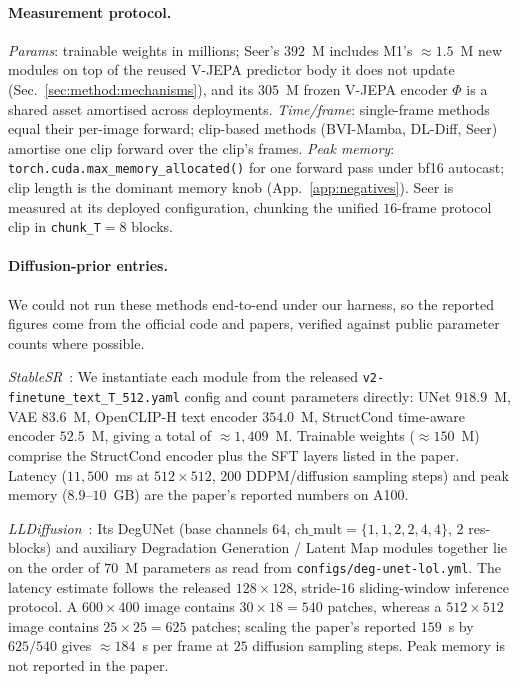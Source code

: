 \paragraph{Measurement protocol.} \emph{Params}: trainable weights in millions; Seer's $392$~M includes M1's ${\approx}1.5$~M new modules on top of the reused V-JEPA predictor body it does not update (Sec.~\ref{sec:method:mechanisms}), and its $305$~M frozen V-JEPA encoder $\Phi$ is a shared asset amortised across deployments. \emph{Time/frame}: single-frame methods equal their per-image forward; clip-based methods (BVI-Mamba, DL-Diff, Seer) amortise one clip forward over the clip's frames. \emph{Peak memory}: \texttt{torch.cuda.max\_memory\_allocated()} for one forward pass under bf16 autocast; clip length is the dominant memory knob (App.~\ref{app:negatives}). Seer is measured at its deployed configuration, chunking the unified $16$-frame protocol clip in \texttt{chunk\_T}${=}8$ blocks.

\paragraph{Diffusion-prior entries.} We could not run these methods end-to-end under our harness, so the reported figures come from the official code and papers, verified against public parameter counts where possible.

\emph{StableSR}~\citep{stablesr}: We instantiate each module from the released \texttt{v2-finetune\_text\_T\_512.yaml} config and count parameters directly: UNet $918.9$~M, VAE $83.6$~M, OpenCLIP-H text encoder $354.0$~M, StructCond time-aware encoder $52.5$~M, giving a total of ${\approx}1{,}409$~M. Trainable weights ($\approx\!150$~M) comprise the StructCond encoder plus the SFT layers listed in the paper. Latency ($11{,}500$~ms at $512{\times}512$, $200$ DDPM/diffusion sampling steps) and peak memory ($8.9$--$10$~GB) are the paper's reported numbers on A100.

\emph{LLDiffusion}~\citep{lldiffusion}: Its DegUNet (base channels $64$, $\text{ch\_mult}{=}\{1,1,2,2,4,4\}$, $2$ res-blocks) and auxiliary Degradation Generation / Latent Map modules together lie on the order of $70$~M parameters as read from \texttt{configs/deg-unet-lol.yml}. The latency estimate follows the released $128{\times}128$, stride-$16$ sliding-window inference protocol. A $600{\times}400$ image contains $30{\times}18=540$ patches, whereas a $512{\times}512$ image contains $25{\times}25=625$ patches; scaling the paper's reported $159$~s by $625/540$ gives ${\approx}184$~s per frame at $25$ diffusion sampling steps. Peak memory is not reported in the paper.

